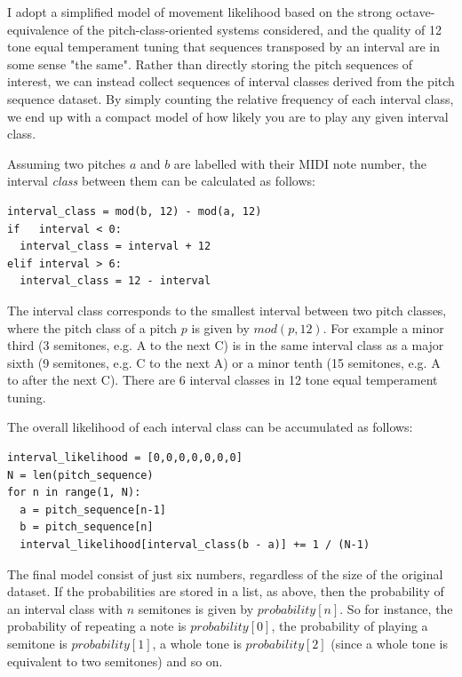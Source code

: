 \documentclass[sigconf]{nimeart}
\begin{document}
I adopt a simplified model of movement likelihood based on the strong octave-equivalence of the pitch-class-oriented systems considered, and the quality of 12 tone equal temperament tuning that sequences transposed by an interval are in some sense "the same". Rather than directly storing the pitch sequences of interest, we can instead collect sequences of interval classes derived from the pitch sequence dataset. By simply counting the relative frequency of each interval class, we end up with a compact model of how likely you are to play any given interval class.

Assuming two pitches $a$ and $b$ are labelled with their MIDI note number, the interval \emph{class} between them can be calculated as follows:

\begin{Verbatim}[breaklines=true,breakanywhere=true,fontsize=\footnotesize]
interval_class = mod(b, 12) - mod(a, 12)
if   interval < 0:
  interval_class = interval + 12
elif interval > 6:
  interval_class = 12 - interval
\end{Verbatim}

The interval class corresponds to the smallest interval between two pitch classes, where the pitch class of a pitch $p$ is given by $mod(p, 12)$. For example a minor third (3 semitones, e.g. A to the next C) is in the same interval class as a major sixth (9 semitones, e.g. C to the next A) or a minor tenth (15 semitones, e.g. A to after the next C). There are 6 interval classes in 12 tone equal temperament tuning.

The overall likelihood of each interval class can be accumulated as follows:

\begin{Verbatim}[breaklines=true,breakanywhere=true,fontsize=\footnotesize]
interval_likelihood = [0,0,0,0,0,0,0]
N = len(pitch_sequence)
for n in range(1, N):
  a = pitch_sequence[n-1]
  b = pitch_sequence[n]
  interval_likelihood[interval_class(b - a)] += 1 / (N-1)
\end{Verbatim}

The final model consist of just six numbers, regardless of the size of the original dataset. If the probabilities are stored in a list, as above, then the probability of an interval class with $n$ semitones is given by $probability[n]$. So for instance, the probability of repeating a note is $probability[0]$, the probability of playing a semitone is $probability[1]$, a whole tone is $probability[2]$ (since a whole tone is equivalent to two semitones) and so on.
\end{document}
